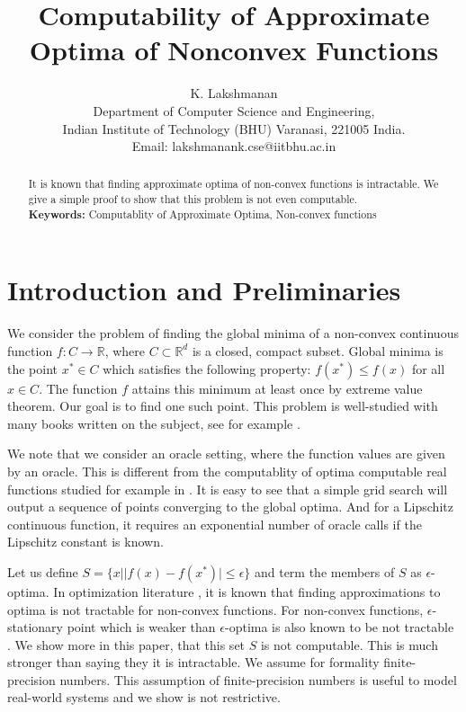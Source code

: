 	\title{Computability of Approximate Optima of Nonconvex Functions}
	\author{K. Lakshmanan \\ Department of Computer Science and Engineering, \\ Indian Institute of Technology (BHU) Varanasi, 221005 India. \\ Email: lakshmanank.cse@iitbhu.ac.in}
	\date{}

	\maketitle
		
	\begin{abstract}
		It is known that finding approximate optima of non-convex functions is intractable. We give a simple proof to show that this problem is not even computable. \\ 
		\textbf{Keywords:}	Computablity of Approximate Optima, Non-convex functions
	\end{abstract}
	
	\section{Introduction and Preliminaries}
	We consider the problem of finding the global minima of a non-convex continuous function $f:  C \rightarrow \mathbb{R}$, where $ C \subset \mathbb{R}^d$ is a closed, compact subset. Global minima is the point $x^* \in C$ which satisfies the following property: $f(x^*) \leq f(x)$ for all $x \in C$. The function $f$ attains this minimum at least once by extreme value theorem. Our goal is to find one such point. This problem is well-studied with many books written on the subject, see for example \cite{globook}.

	We note that we consider an oracle setting, where the function values are given by an oracle. This is different from the computablity of optima computable real functions studied for example in \cite{pour}. It is easy to see that a simple grid search will output a sequence of points converging to the global optima. And for a Lipschitz continuous function, it requires an exponential number of oracle calls \cite{nest} if the Lipschitz constant is known. %
	
	Let us define $S = \{x||f(x)-f(x^*)|\leq \epsilon\}$ and term the members of $S$ as $\epsilon$-optima. In optimization literature \cite{foster2019complexity,zhang2020complexity}, it is known that finding approximations to optima is not tractable for non-convex functions. For non-convex functions, $\epsilon$-stationary point which is weaker than $\epsilon$-optima is also known to be not tractable \cite{zhang2020complexity}. We show more in this paper, that this set $S$ is not computable. This is much stronger than saying they it is intractable. We assume for formality finite-precision numbers. This assumption of finite-precision numbers is useful to model real-world systems and we show is not restrictive.
	

